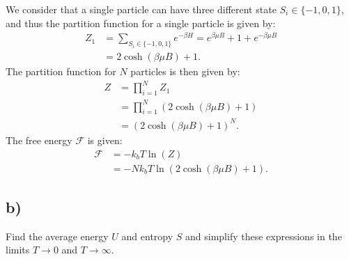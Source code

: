 \documentclass[a4paper]{article}
\newcommand{\newparagraph}{\vspace{.5cm}\noindent}
\newcommand{\f}{\mathcal{F}}
\begin{document}
\newparagraph
We consider that a single particle can have three different state $S_i\in\{-1, 0, 1\}$, and thus the partition function for a single particle is given by:
\begin{align*}
    Z_1 &= \sum_{S_i\in\{-1, 0, 1\}}e^{-\beta H} = e^{\beta\mu B} + 1 + e^{-\beta\mu B}\\
    &= 2\cosh(\beta\mu B) + 1.
\end{align*}The partition function for $N$ particles is then given by:
\begin{align*}
    Z &= \prod_{i = 1}^N Z_1\\
    &= \prod_{i = 1}^N \left(2\cosh(\beta\mu B) + 1\right)\\
    &= \left(2\cosh(\beta\mu B) + 1\right)^N.
\end{align*}The free energy $\f$ is given:
\begin{align*}
    \f &= -k_bT\ln(Z)\\
    &= -Nk_bT\ln\left(2\cosh(\beta\mu B) + 1\right).
\end{align*}

\subsection*{b)}
Find the average energy $U$ and entropy $S$ and simplify these expressions in the limits $T\to0$ and $T\to\infty$.
\end{document}
